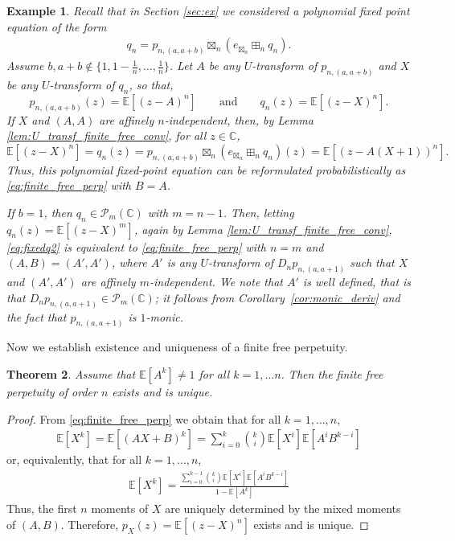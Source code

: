 \documentclass[a4paper,11pt]{amsart}
\numberwithin{equation}{section}
\newtheorem{theorem}{Theorem}[section]
\newtheorem{example}[theorem]{Example}
\newcommand{\C}{\mathbb{C}}
\newcommand{\E}{\mathbb{E}}
\newcommand{\pols}{\mathcal P}
\begin{document}
\begin{example}
    Recall that in Section \ref{sec:ex} we considered a polynomial fixed point equation of the form 
\begin{align}\label{eq:fixedq2}
q_n
=
p_{n,(a,a+b)}\boxtimes_n (e_{\boxtimes_n} \boxplus_n q_n).
\end{align}
Assume $b,a+b\notin\{1,1-\frac1n,\ldots,\frac1n\}$. 
Let $A$ be any $U$-transform of $p_{n,(a,a+b)}$ and $X$ be any $U$-transform of $q_n$, so that,
 \[
    p_{n,(a,a+b)}(z) = \E[(z-A)^n]\qquad\mbox{and}\qquad     q_n(z) = \E[(z-X)^n]. 
\]
If $X$ and $(A,A)$ are affinely $n$-independent, then, by Lemma \ref{lem:U_transf_finite_free_conv}, for all $z\in\C$,
\[
\E[(z-X)^n] = q_n(z)  
=
p_{n,(a,a+b)}\boxtimes_n (e_{\boxtimes_n} \boxplus_n q_n)(z) = \E[(z-A(X+1))^n].
\]
Thus, this polynomial fixed-point equation can be reformulated probabilistically as \eqref{eq:finite_free_perp} with $B=A$. 

If $b=1$, then $q_n\in\pols_{m}(\C)$ with $m=n-1$. Then, letting $q_n(z) = \E[(z-X)^{m}]$, again by Lemma \ref{lem:U_transf_finite_free_conv},  \eqref{eq:fixedq2} is equivalent to \eqref{eq:finite_free_perp} with $n=m$ and $(A,B)=(A',A')$, where $A'$ is any $U$-transform of $D_n p_{n,(a,a+1)}$ such that $X$ and $(A',A')$ are affinely $m$-independent. We note that $A'$ is well defined, that is that $D_n p_{n,(a,a+1)}\in\pols_{m}(\C)$; it follows from Corollary~\ref{cor:monic_deriv} and the fact that $p_{n,(a,a+1)}$ is $1$-monic. 
\end{example}

 Now we establish existence and uniqueness of a finite free perpetuity. 
\begin{theorem}
\label{thm:finite_free_perp} 
Assume that $\E[A^k]\neq 1$ for all $k=1,\dots n$. Then the finite free perpetuity of order $n$  exists and is unique. 
\end{theorem}
    \begin{proof}
    From \eqref{eq:finite_free_perp} we obtain that for all $k=1,\ldots,n$,
    \begin{align*}
        \E[X^k]=\E[(AX+B)^k]
         = \sum_{i=0}^k\binom{k}{i}\E[X^i]\E[A^iB^{k-i}]
    \end{align*}
    or, equivalently, that for all $k=1,\ldots,n$,
\begin{align}\label{eq:finte_free_perp_moments}
        \E[X^k]=\frac{\sum_{i=0}^{k-1}\binom{k}{i}\E[X^i]\E[A^iB^{k-i}]}{1-\E[A^k]}
    \end{align}
Thus, the first $n$ moments of $X$ are uniquely determined by the mixed moments of $(A,B)$. Therefore, 
$p_X(z)=\E[(z-X)^n]$ exists and is unique. 
\end{proof}
\end{document}
